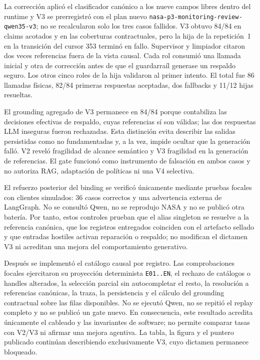 La corrección aplicó el clasificador canónico a los nueve campos libres dentro
del runtime y V3 se prerregistró con el plan nuevo
\texttt{nasa-p3-monitoring-review-qwen35-v3}; no se recalcularon solo los tres
casos fallidos. V3 obtuvo 84/84 en claims acotados y en las coberturas
contractuales, pero la hija de la repetición~1 en la transición del cursor 353
terminó en fallo. Supervisor y limpiador citaron dos veces referencias fuera de
la vista causal. Cada rol consumió una llamada inicial y otra de corrección antes
de que el guardarraíl generase un respaldo seguro. Los otros cinco roles de la
hija validaron al primer intento. El total fue 86 llamadas físicas, 82/84
primeras respuestas aceptadas, dos fallbacks y 11/12 hijas resueltas.

El grounding agregado de V3 permanece en 84/84 porque contabiliza las decisiones
efectivas de respaldo, cuyas referencias sí son válidas; las dos respuestas LLM
inseguras fueron rechazadas. Esta distinción evita describir las salidas
persistidas como no fundamentadas y, a la vez, impide ocultar que la generación
falló. V2 reveló fragilidad de alcance semántico y V3 fragilidad en la generación
de referencias. El gate funcionó como instrumento de falsación en ambos casos y
no autoriza RAG, adaptación de políticas ni una V4 selectiva.

El refuerzo posterior del binding se verificó únicamente mediante pruebas
focales con clientes simulados: 36 casos correctos y una advertencia externa de
LangGraph. No se consultó Qwen, no se reprodujo NASA y no se publicó otra
batería. Por tanto, estos controles prueban que el alias singleton se resuelve a
la referencia canónica, que los registros entregados coinciden con el artefacto
sellado y que entradas hostiles activan reparación o respaldo; no modifican el
dictamen V3 ni acreditan una mejora del comportamiento generativo.

Después se implementó el catálogo causal por registro. Las comprobaciones
focales ejercitaron su proyección determinista \texttt{E01..EN}, el rechazo de
catálogos o handles alterados, la selección parcial sin autocompletar el resto,
la resolución a referencias canónicas, la traza, la persistencia y el cálculo
del grounding contractual sobre las filas disponibles. No se ejecutó Qwen, no
se repitió el replay completo y no se publicó un gate nuevo. En consecuencia,
este resultado acredita únicamente el cableado y las invariantes de software;
no permite comparar tasas con V2/V3 ni afirmar una mejora agentiva. La tabla,
la figura y el puntero publicado continúan describiendo exclusivamente V3,
cuyo dictamen permanece bloqueado.


